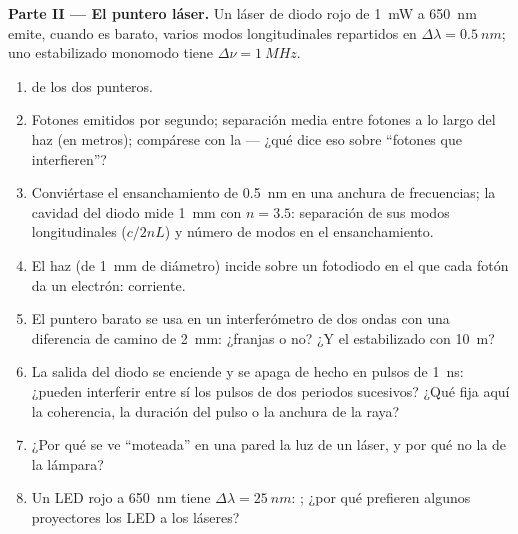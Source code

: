 \begin{problem}
\medskip
\noindent\textbf{Parte II --- El puntero láser.}
Un láser de diodo rojo de \qty{1}{mW} a \qty{650}{nm} emite, cuando es barato, varios
modos longitudinales repartidos en $\Delta\lambda = \qty{0.5}{nm}$; uno estabilizado
monomodo tiene $\Delta\nu = \qty{1}{MHz}$.
\begin{enumerate}[resume]
  \item {} de los dos punteros.
  \item Fotones emitidos por segundo; separación media entre fotones a lo largo
        del haz (en metros); compárese con la  ---
        ¿qué dice eso sobre ``fotones que interfieren''?
  \item Conviértase el ensanchamiento de \qty{0.5}{nm} en una anchura de frecuencias; la
        cavidad del diodo mide \qty{1}{mm} con $n = 3.5$: separación de sus
        modos longitudinales ($c/2nL$) y número de modos en el
        ensanchamiento.
  \item El haz (de \qty{1}{mm} de diámetro) incide sobre un fotodiodo en el que
        cada fotón da un electrón: corriente.
  \item El puntero barato se usa en un interferómetro de dos ondas con una
        diferencia de camino de \qty{2}{mm}: ¿franjas o no? ¿Y el estabilizado
        con \qty{10}{m}?
  \item La salida del diodo se enciende y se apaga de hecho en pulsos de
        \qty{1}{ns}: ¿pueden interferir entre sí los pulsos de dos periodos
        sucesivos? ¿Qué fija aquí la coherencia, la duración del
        pulso o la anchura de la raya?
  \item ¿Por qué se ve ``moteada'' en una pared la luz de un láser, y por qué
        no la de la lámpara?
  \item Un LED rojo a \qty{650}{nm} tiene $\Delta\lambda = \qty{25}{nm}$: ; ¿por qué prefieren algunos proyectores los LED a los láseres?
\end{enumerate}


\end{problem}
